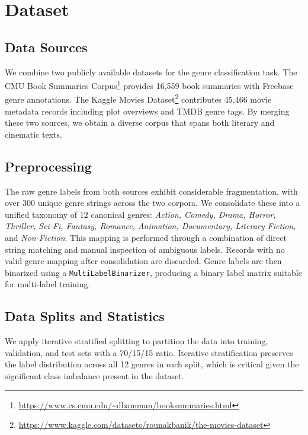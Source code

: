 \documentclass[11pt,a4paper]{article}
\begin{document}
\section{Dataset}

\subsection{Data Sources}

We combine two publicly available datasets for the genre classification task. The CMU Book Summaries Corpus\footnote{\url{https://www.cs.cmu.edu/~dbamman/booksummaries.html}} provides 16,559 book summaries with Freebase genre annotations. The Kaggle Movies Dataset\footnote{\url{https://www.kaggle.com/datasets/rounakbanik/the-movies-dataset}} contributes 45,466 movie metadata records including plot overviews and TMDB genre tags. By merging these two sources, we obtain a diverse corpus that spans both literary and cinematic texts.

\subsection{Preprocessing}

The raw genre labels from both sources exhibit considerable fragmentation, with over 300 unique genre strings across the two corpora. We consolidate these into a unified taxonomy of 12 canonical genres: \textit{Action, Comedy, Drama, Horror, Thriller, Sci-Fi, Fantasy, Romance, Animation, Documentary, Literary Fiction}, and \textit{Non-Fiction}. This mapping is performed through a combination of direct string matching and manual inspection of ambiguous labels. Records with no valid genre mapping after consolidation are discarded. Genre labels are then binarized using a \texttt{MultiLabelBinarizer}, producing a binary label matrix suitable for multi-label training.

\subsection{Data Splits and Statistics}

We apply iterative stratified splitting \cite{sechidis2011} to partition the data into training, validation, and test sets with a 70/15/15 ratio. Iterative stratification preserves the label distribution across all 12 genres in each split, which is critical given the significant class imbalance present in the dataset.
\end{document}
